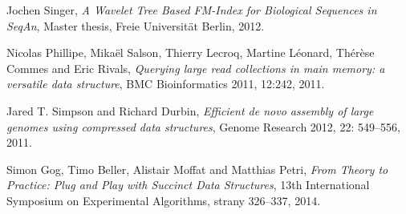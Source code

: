 \begin{thebibliography}{99}
        Jochen Singer,
        \emph{A Wavelet Tree Based FM-Index for Biological Sequences in SeqAn},
        Master thesis,
        Freie Universit\"{a}t Berlin,
        2012.
        
        Nicolas Phillipe, Mika\"{e}l Salson, Thierry Lecroq, Martine Léonard, Thér\`{e}se Commes and Eric Rivals,
        \emph{Querying large read collections in main memory: a versatile data structure},
        BMC Bioinformatics 2011, 12:242,
        2011.
        
        Jared T. Simpson and Richard Durbin,
        \emph{Efficient de novo assembly of large genomes using compressed data structures},
        Genome Research 2012, 22: 549--556,
        2011.
        
        Simon Gog, Timo Beller, Alistair Moffat and Matthias Petri,
        \emph{From Theory to Practice: Plug and Play with Succinct Data Structures},
        13th International Symposium on Experimental Algorithms, strany 326--337,
        2014.

\end{thebibliography}